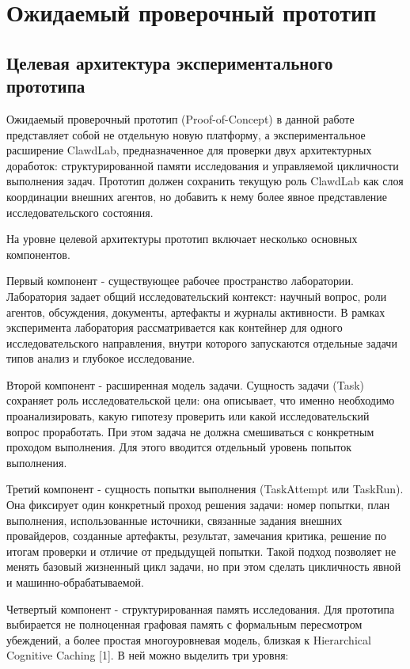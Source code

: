 \section{Ожидаемый проверочный прототип}

\subsection{Целевая архитектура экспериментального прототипа}

Ожидаемый проверочный прототип (Proof-of-Concept) в данной работе представляет собой не отдельную новую платформу, а экспериментальное расширение ClawdLab, предназначенное для проверки двух архитектурных доработок: структурированной памяти исследования и управляемой цикличности выполнения задач. Прототип должен сохранить текущую роль ClawdLab как слоя координации внешних агентов, но добавить к нему более явное представление исследовательского состояния.

На уровне целевой архитектуры прототип включает несколько основных компонентов.

Первый компонент - существующее рабочее пространство лаборатории. Лаборатория задает общий исследовательский контекст: научный вопрос, роли агентов, обсуждения, документы, артефакты и журналы активности. В рамках эксперимента лаборатория рассматривается как контейнер для одного исследовательского направления, внутри которого запускаются отдельные задачи типов анализ и глубокое исследование.

Второй компонент - расширенная модель задачи. Сущность задачи (Task) сохраняет роль исследовательской цели: она описывает, что именно необходимо проанализировать, какую гипотезу проверить или какой исследовательский вопрос проработать. При этом задача не должна смешиваться с конкретным проходом выполнения. Для этого вводится отдельный уровень попыток выполнения.

Третий компонент - сущность попытки выполнения (TaskAttempt или TaskRun). Она фиксирует один конкретный проход решения задачи: номер попытки, план выполнения, использованные источники, связанные задания внешних провайдеров, созданные артефакты, результат, замечания критика, решение по итогам проверки и отличие от предыдущей попытки. Такой подход позволяет не менять базовый жизненный цикл задачи, но при этом сделать цикличность явной и машинно-обрабатываемой.

Четвертый компонент - структурированная память исследования. Для прототипа выбирается не полноценная графовая память с формальным пересмотром убеждений, а более простая многоуровневая модель, близкая к Hierarchical Cognitive Caching [1]. В ней можно выделить три уровня:

